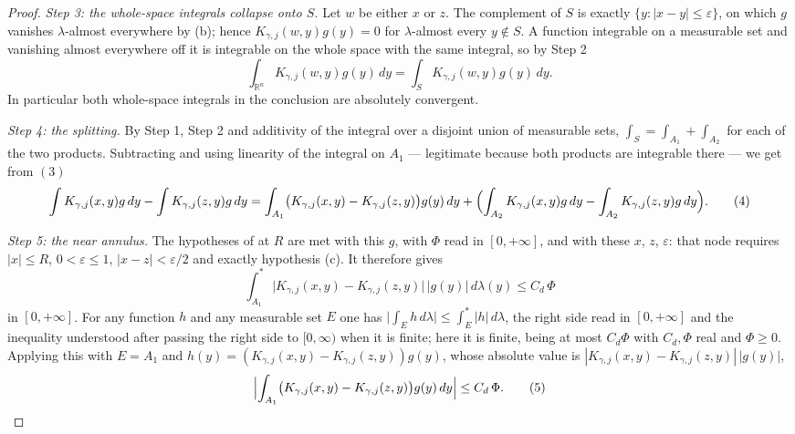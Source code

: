 \begin{proof}
\emph{Step 3: the whole-space integrals collapse onto $S$.}  Let $w$ be either
$x$ or $z$.  The complement of $S$ is exactly $\{y : |x-y| \leq \varepsilon\}$,
on which $g$ vanishes $\lambda$-almost everywhere by (b); hence
$K_{\gamma,j}(w,y)g(y) = 0$ for $\lambda$-almost every $y \notin S$.  A
function integrable on a measurable set and vanishing almost everywhere off it
is integrable on the whole space with the same integral, so by Step 2
\begin{equation*}
  \int_{\mathbb{R}^n}K_{\gamma,j}(w,y)g(y)\,dy
    = \int_S K_{\gamma,j}(w,y)g(y)\,dy . \tag{3}
\end{equation*}
In particular both whole-space integrals in the conclusion are absolutely
convergent.

\emph{Step 4: the splitting.}  By Step 1, Step 2 and additivity of the integral
over a disjoint union of measurable sets,
$\int_S = \int_{A_1} + \int_{A_2}$ for each of the two products.  Subtracting
and using linearity of the integral on $A_1$ --- legitimate because both
products are integrable there --- we get from $(3)$
\begin{equation*}
  \int K_{\gamma,j}(x,y)g\,dy - \int K_{\gamma,j}(z,y)g\,dy
    = \int_{A_1}\bigl(K_{\gamma,j}(x,y)-K_{\gamma,j}(z,y)\bigr)g(y)\,dy
      + \Bigl(\int_{A_2}K_{\gamma,j}(x,y)g\,dy - \int_{A_2}K_{\gamma,j}(z,y)g\,dy\Bigr) .
  \tag{4}
\end{equation*}

\emph{Step 5: the near annulus.}  The hypotheses of
 at $R$ are met with this $g$,
with $\Phi$ read in $[0,+\infty]$, and with these $x$, $z$, $\varepsilon$: that
node requires $|x| \leq R$, $0 < \varepsilon \leq 1$,
$|x-z| < \varepsilon/2$ and exactly hypothesis (c).  It therefore gives
\[
  \int_{A_1}^{*}\bigl|K_{\gamma,j}(x,y)-K_{\gamma,j}(z,y)\bigr|\,|g(y)|\,d\lambda(y)
    \leq C_d\,\Phi
\]
in $[0,+\infty]$.  For any function $h$ and any measurable set $E$ one has
$\bigl|\int_E h\,d\lambda\bigr| \leq \int_E^{*}|h|\,d\lambda$, the right side
read in $[0,+\infty]$ and the inequality understood after passing the right side
to $[0,\infty)$ when it is finite; here it is finite, being at most $C_d\Phi$
with $C_d, \Phi$ real and $\Phi \geq 0$.  Applying this with $E = A_1$ and
$h(y) = (K_{\gamma,j}(x,y)-K_{\gamma,j}(z,y))g(y)$, whose absolute value is
$|K_{\gamma,j}(x,y)-K_{\gamma,j}(z,y)|\,|g(y)|$,
\begin{equation*}
  \Bigl|\int_{A_1}\bigl(K_{\gamma,j}(x,y)-K_{\gamma,j}(z,y)\bigr)g(y)\,dy\Bigr|
    \leq C_d\,\Phi . \tag{5}
\end{equation*}


\end{proof}

